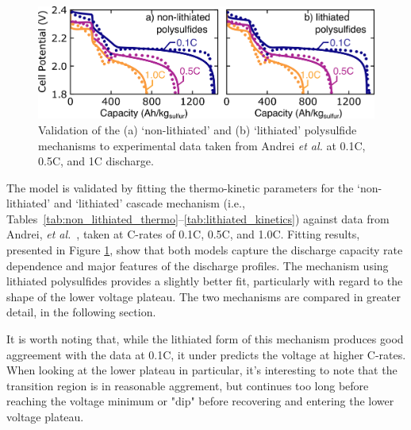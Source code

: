 \documentclass{elsarticle}
\begin{document}
\begin{figure}[b!]
    \centering
    \includegraphics[width=\textwidth]{Figures/Figure2_validation.png}
    \caption{Validation of the (a) `non-lithiated' and (b) `lithiated' polysulfide mechanisms to experimental data taken from Andrei \textit{et al.} \cite{ANDREI2018469} at 0.1C, 0.5C, and 1C discharge.}
    \label{fig:model_validation}
\end{figure}

The model is validated by fitting the thermo-kinetic parameters for the `non-lithiated' and `lithiated' cascade mechanism (i.e., Tables~\ref{tab:non_lithiated_thermo}--\ref{tab:lithiated_kinetics}) against data from Andrei, \textit{et al.}~\cite{ANDREI2018469}, taken at C-rates of 0.1C, 0.5C, and 1.0C. Fitting results, presented in Figure \ref{fig:model_validation}, show that both models capture the discharge capacity rate dependence and major features of the discharge profiles. The mechanism using lithiated polysulfides provides a slightly better fit, particularly with regard to the shape of the lower voltage plateau. The two mechanisms are compared in greater detail, in the following section.  %

It is worth noting that, while the lithiated form of this mechanism produces good aggreement with the data at 0.1C, it under predicts the voltage at higher C-rates. When looking at the lower plateau in particular, it's interesting to note that the transition region is in reasonable aggrement, but continues too long before reaching the voltage minimum or "dip" before recovering and entering the lower voltage plateau. 

\end{document}
